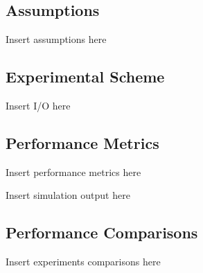 \documentclass[conference]{IEEEtran}
\begin{document}
\subsection{Assumptions}

Insert assumptions here


\subsection{Experimental Scheme}

Insert I/O here


\subsection{Performance Metrics}

Insert performance metrics here


Insert simulation output here


\subsection{Performance Comparisons}

Insert experiments comparisons here

\end{document}
